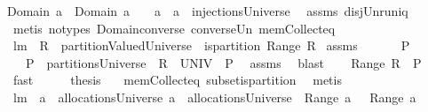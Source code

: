 \begin{isabellebody}
{\isachardoublequoteopen}Domain\ a{}\ {\isasyminter}\ {\isacharparenleft}Domain\ a{}{\isacharparenright}\ {\isacharequal}\ {\isacharbraceleft}{\isacharbraceright}{\isachardoublequoteclose}\ \ {\isachardoublequoteopen}a{}\ {\isasymunion}\ a{}\ {\isasymin}\ injectionsUniverse{\isachardoublequoteclose}\ \isanewline
%
\isadelimproof
%
\endisadelimproof
%
\isatagproof
{}\isamarkupfalse%
\ assms\ disj{\isacharunderscore}Un{\isacharunderscore}runiq\ \isamarkupfalse%
\ {\isacharparenleft}metis\ {\isacharparenleft}no{\isacharunderscore}types{\isacharparenright}\ Domain{\isacharunderscore}converse\ converse{\isacharunderscore}Un\ mem{\isacharunderscore}Collect{\isacharunderscore}eq{\isacharparenright}%
\endisatagproof
{\isafoldproof}%
%
\isadelimproof
\isanewline
%
\endisadelimproof
\isanewline
{}\isamarkupfalse%
\ lm{}{}{\isacharcolon}\ \ {\isachardoublequoteopen}R\ {\isasymin}\ partitionValuedUniverse{\isachardoublequoteclose}\ \ {\isachardoublequoteopen}is{\isacharunderscore}partition\ {\isacharparenleft}Range\ R{\isacharparenright}{\isachardoublequoteclose}\isanewline
%
\isadelimproof
%
\endisadelimproof
%
\isatagproof
{}\isamarkupfalse%
\ assms\ \isanewline
{}\isamarkupfalse%
\ {\isacharminus}\isanewline
\ \ \isamarkupfalse%
\ P\ \isanewline
\ \ {}{\isacharcolon}\ {\isachardoublequoteopen}P\ {\isasymin}\ partitionsUniverse\ {\isacharampersand}\ R\ {\isasymsubseteq}\ UNIV\ {\isasymtimes}\ P{\isachardoublequoteclose}\ \isamarkupfalse%
\ assms\ \isamarkupfalse%
\ blast\isanewline
\ \ \isamarkupfalse%
\ {\isachardoublequoteopen}Range\ R\ {\isasymsubseteq}\ P{\isachardoublequoteclose}\ \isamarkupfalse%
\ {}\ \isamarkupfalse%
\ fast\isanewline
\ \ \isamarkupfalse%
\ \isamarkupfalse%
\ {\isacharquery}thesis\ \isamarkupfalse%
\ {}\ mem{\isacharunderscore}Collect{\isacharunderscore}eq\ subset{\isacharunderscore}is{\isacharunderscore}partition\ \isamarkupfalse%
\ {\isacharparenleft}metis{\isacharparenright}\isanewline
{}\isamarkupfalse%
%
\endisatagproof
{\isafoldproof}%
%
\isadelimproof
\isanewline
%
\endisadelimproof
\isanewline
{}\isamarkupfalse%
\ lm{}{}{\isacharcolon}\ \ {\isachardoublequoteopen}a{}\ {\isasymin}\ allocationsUniverse{\isachardoublequoteclose}\ {\isachardoublequoteopen}a{}\ {\isasymin}\ allocationsUniverse{\isachardoublequoteclose}\ {\isachardoublequoteopen}{\isasymUnion}\ {\isacharparenleft}Range\ a{}{\isacharparenright}\ {\isasyminter}\ {\isacharparenleft}{\isasymUnion}\ {\isacharparenleft}Range\ a{}{\isacharparenright}{\isacharparenright}{\isacharequal}{\isacharbraceleft}{\isacharbraceright}{\isachardoublequoteclose}\isanewline

\end{isabellebody}
